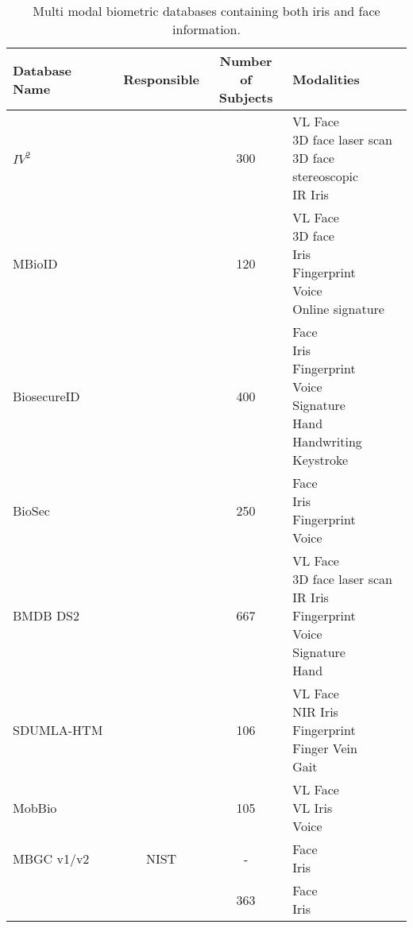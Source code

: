 \begin{table}[H]
\centering
\caption{Multi modal biometric databases containing both iris and face information.}
\begin{tabularx}{1.2\textwidth}{ XccX }
\hline
\rowcolor{Grey}
\textbf{Database Name}&\textbf{Responsible}&\makecell{\textbf{Number of} \\ \textbf{Subjects}}&\textbf{Modalities}\\
\hline
$IV^2$&\cite{Petrovska-Delacretaz2008a}&300&\makecell{VL Face\\3D face laser scan\\ 3D face stereoscopic\\IR Iris}\\
\hline
\rowcolor{lightGrey}
MBioID&\cite{Dessimoz2007}&120&\makecell{VL Face\\3D face \\ Iris\\Fingerprint\\Voice\\ Online signature}\\
\hline
BiosecureID&\cite{BiosecID2008}&400&\makecell{Face\\Iris\\Fingerprint\\Voice\\Signature\\Hand\\Handwriting\\Keystroke}\\
\hline
\rowcolor{lightGrey}
BioSec&\cite{Biosec2007}&250&\makecell{Face\\ Iris\\Fingerprint\\Voice}\\
\hline
BMDB DS2&\cite{Ortega-Garcia2010}&667&\makecell{VL Face\\3D face laser scan\\ IR Iris\\Fingerprint\\Voice\\Signature\\Hand }\\
\hline
\rowcolor{lightGrey}
SDUMLA-HTM&\cite{Yin2011}&106&\makecell{VL Face  \\ NIR Iris \\ Fingerprint \\ Finger Vein\\Gait\\} \\
\hline
MobBio&\cite{Sequeira2014}&105& \makecell{VL Face \\ VL Iris \\ Voice} \\
\hline
\rowcolor{lightGrey}
MBGC v1/v2&NIST&-&\makecell{Face\\Iris}\\
\hline
&\cite{Bowyer2016b}&363&\makecell{Face\\Iris}\\
\hline
\end{tabularx}
\label{MultiDatabase}
\end{table}















